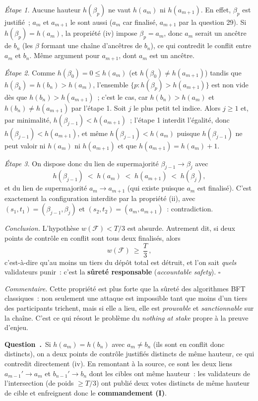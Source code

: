\documentclass[11pt,a4paper]{article}
\renewcommand{\Q}{\medskip\par\stepcounter{qcnt}\noindent\textbf{\color{cnc}Question~\theqcnt.}~}
\begin{document}
\emph{Étape 1.} Aucune hauteur $h(\beta_p)$ ne vaut $h(a_m)$ ni $h(a_{m+1})$. En effet,
$\beta_p$ est justifié~; $a_m$ et $a_{m+1}$ le sont aussi ($a_m$ car finalisé, $a_{m+1}$ par
la question 29). Si $h(\beta_p)=h(a_m)$, la propriété (iv) impose $\beta_p=a_m$, donc $a_m$
serait un ancêtre de $b_n$ (les $\beta$ formant une chaîne d'ancêtres de $b_n$), ce qui
contredit le conflit entre $a_m$ et $b_n$. Même argument pour $a_{m+1}$, dont $a_m$ est un
ancêtre.

\emph{Étape 2.} Comme $h(\beta_0)=0\le h(a_m)$ (et $h(\beta_0)\ne h(a_{m+1})$) tandis que
$h(\beta_k)=h(b_n)>h(a_m)$, l'ensemble $\{p : h(\beta_p)>h(a_{m+1})\}$ est non vide dès que
$h(b_n)>h(a_{m+1})$~; c'est le cas, car $h(b_n)>h(a_m)$ et $h(b_n)\ne h(a_{m+1})$ par
l'étape 1. Soit $j$ le plus petit tel indice. Alors $j\ge 1$ et, par minimalité,
$h(\beta_{j-1})<h(a_{m+1})$~; l'étape 1 interdit l'égalité, donc
$h(\beta_{j-1})<h(a_{m+1})$, et même $h(\beta_{j-1})<h(a_m)$ puisque $h(\beta_{j-1})$ ne peut
valoir ni $h(a_m)$ ni $h(a_{m+1})$ et que $h(a_{m+1})=h(a_m)+1$.

\emph{Étape 3.} On dispose donc du lien de supermajorité $\beta_{j-1}\to\beta_j$ avec
\[ h(\beta_{j-1})\;<\;h(a_m)\;<\;h(a_{m+1})\;<\;h(\beta_j), \]
et du lien de supermajorité $a_m\to a_{m+1}$ (qui existe puisque $a_m$ est finalisé). C'est
exactement la configuration interdite par la propriété (ii), avec $(s_1,t_1)=(\beta_{j-1},
\beta_j)$ et $(s_2,t_2)=(a_m,a_{m+1})$~: contradiction.

\emph{Conclusion.} L'hypothèse $w(\mathcal{F})<T/3$ est absurde. Autrement dit, si deux
points de contrôle en conflit sont tous deux finalisés, alors
\[ w(\mathcal{F})\ \ge\ \frac{T}{3}\,, \]
c'est-à-dire qu'au moins un tiers du dépôt total est détruit, et l'on sait \emph{quels}
validateurs punir~: c'est la \textbf{sûreté responsable} (\emph{accountable safety}).
\hfill$\square$

\emph{Commentaire.} Cette propriété est plus forte que la sûreté des algorithmes BFT
classiques~: non seulement une attaque est impossible tant que moins d'un tiers des
participants trichent, mais si elle a lieu, elle est \emph{prouvable} et \emph{sanctionnable}
sur la chaîne. C'est ce qui résout le problème du \emph{nothing at stake} propre à la preuve
d'enjeu.

\Q Si $h(a_m)=h(b_n)$ avec $a_m\ne b_n$ (ils sont en conflit donc distincts), on a deux
points de contrôle justifiés distincts de même hauteur, ce qui contredit directement (iv). En
remontant à la source, ce sont les deux liens $a_{m-1}'\to a_m$ et $b_{n-1}'\to b_n$ dont les
cibles ont même hauteur~: les validateurs de l'intersection (de poids $\ge T/3$) ont publié
deux votes distincts de même hauteur de cible et enfreignent donc le \textbf{commandement
(I)}.
\end{document}
